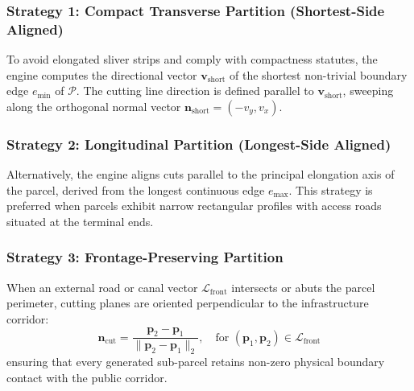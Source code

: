 \documentclass[conference]{IEEEtran}
\begin{document}
\subsubsection{Strategy 1: Compact Transverse Partition (Shortest-Side Aligned)}
To avoid elongated sliver strips and comply with compactness statutes, the engine computes the directional vector $\mathbf{v}_{\text{short}}$ of the shortest non-trivial boundary edge $e_{\text{min}}$ of $\mathcal{P}$. The cutting line direction is defined parallel to $\mathbf{v}_{\text{short}}$, sweeping along the orthogonal normal vector $\mathbf{n}_{\text{short}} = (-v_y, v_x)$.

\subsubsection{Strategy 2: Longitudinal Partition (Longest-Side Aligned)}
Alternatively, the engine aligns cuts parallel to the principal elongation axis of the parcel, derived from the longest continuous edge $e_{\text{max}}$. This strategy is preferred when parcels exhibit narrow rectangular profiles with access roads situated at the terminal ends.

\subsubsection{Strategy 3: Frontage-Preserving Partition}
When an external road or canal vector $\mathcal{L}_{\text{front}}$ intersects or abuts the parcel perimeter, cutting planes are oriented perpendicular to the infrastructure corridor:
\begin{equation}
    \mathbf{n}_{\text{cut}} = \frac{\mathbf{p}_2 - \mathbf{p}_1}{\|\mathbf{p}_2 - \mathbf{p}_1\|_2}, \quad \text{for } (\mathbf{p}_1, \mathbf{p}_2) \in \mathcal{L}_{\text{front}}
\end{equation}
ensuring that every generated sub-parcel retains non-zero physical boundary contact with the public corridor.
\end{document}
